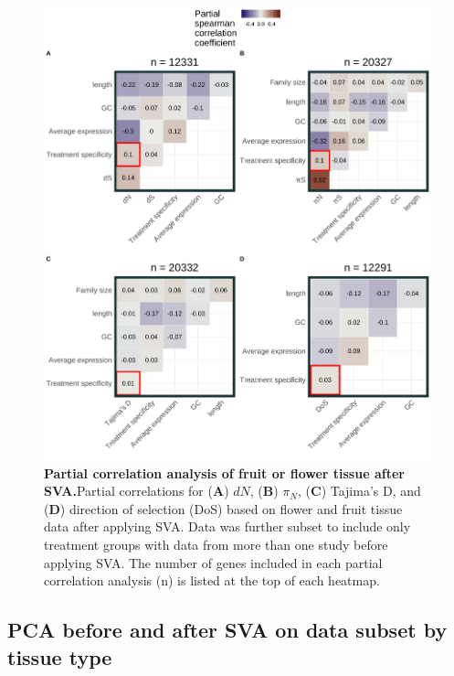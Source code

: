 \documentclass[12pt]{article}
\begin{document}
\begin{figure}[H]
\includegraphics[width=\linewidth, height=\textheight, keepaspectratio]{figures/appendix_a/partialCorrelations_withoutTissueSpecificityAfterSVA_fruitORflower_2023-02-21.pdf}
\caption{\textbf{Partial correlation analysis of fruit or flower tissue after SVA.}Partial correlations for (\textbf{A}) $dN$, (\textbf{B}) $\pi_N$, (\textbf{C}) Tajima's D, and (\textbf{D}) direction of selection (DoS) based on flower and fruit tissue data after applying SVA. Data was further subset to include only treatment groups with data from more than one study before applying SVA. The number of genes included in each partial correlation analysis (n) is listed at the top of each heatmap.}%
\end{figure}

\subsection*{PCA before and after SVA on data subset by tissue type} 
\end{document}
